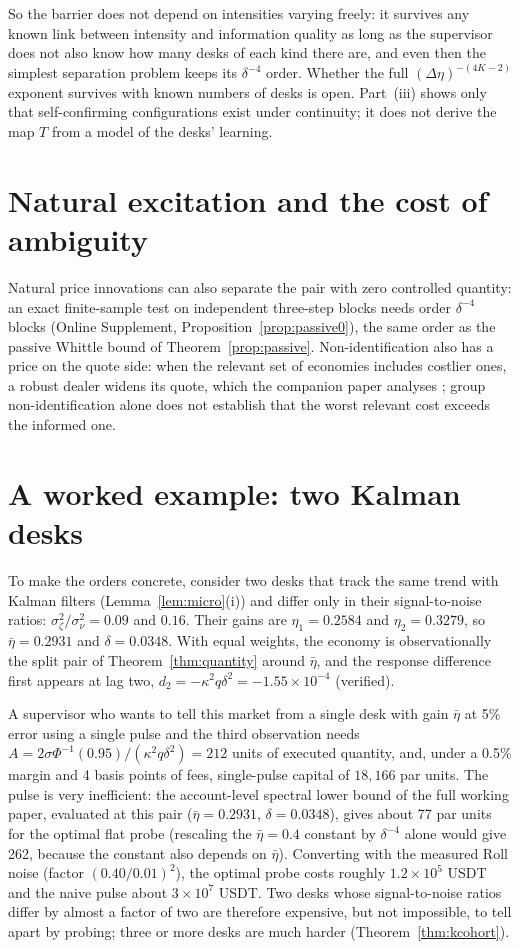 \documentclass[12pt]{article}
\theoremstyle{definition}
\theoremstyle{remark}
\begin{document}
So the barrier does not depend on intensities varying freely: it survives any known link between intensity and information quality as long as the supervisor does not also know how many desks of each kind there are, and even then the simplest separation problem keeps its $\delta^{-4}$ order. Whether the full $(\Delta\eta)^{-(4K-2)}$ exponent survives with known numbers of desks is open. Part~(iii) shows only that self-confirming configurations exist under continuity; it does not derive the map $T$ from a model of the desks' learning.

\section{Natural excitation and the cost of ambiguity}

Natural price innovations can also separate the pair with zero controlled quantity: an exact finite-sample test on independent three-step blocks needs order $\delta^{-4}$ blocks (Online Supplement, Proposition~\ref{prop:passive0}), the same order as the passive Whittle bound of Theorem~\ref{prop:passive}. Non-identification also has a price on the quote side: when the relevant set of economies includes costlier ones, a robust dealer widens its quote, which the companion paper analyses \citep{niroula2026b}; group non-identification alone does not establish that the worst relevant cost exceeds the informed one.
\section{A worked example: two Kalman desks}\label{sec:worked}

To make the orders concrete, consider two desks that track the same trend with Kalman filters (Lemma~\ref{lem:micro}(i)) and differ only in their signal-to-noise ratios: $\sigma_\zeta^2/\sigma_\nu^2=0.09$ and $0.16$. Their gains are $\eta_1=0.2584$ and $\eta_2=0.3279$, so $\bar\eta=0.2931$ and $\delta=0.0348$. With equal weights, the economy is observationally the split pair of Theorem~\ref{thm:quantity} around $\bar\eta$, and the response difference first appears at lag two, $d_2=-\kappa^2q\delta^2=-1.55\times10^{-4}$ (verified).

A supervisor who wants to tell this market from a single desk with gain $\bar\eta$ at 5\% error using a single pulse and the third observation needs $A=2\sigma\Phi^{-1}(0.95)/(\kappa^2q\delta^2)=212$ units of executed quantity, and, under a 0.5\% margin and 4 basis points of fees, single-pulse capital of $18{,}166$ par units. The pulse is very inefficient: the account-level spectral lower bound of the full working paper, evaluated at this pair ($\bar\eta=0.2931$, $\delta=0.0348$), gives about 77 par units for the optimal flat probe (rescaling the $\bar\eta=0.4$ constant by $\delta^{-4}$ alone would give 262, because the constant also depends on $\bar\eta$). Converting with the measured Roll noise (factor $(0.40/0.01)^2$), the optimal probe costs roughly $1.2\times10^5$ USDT and the naive pulse about $3\times10^7$ USDT. Two desks whose signal-to-noise ratios differ by almost a factor of two are therefore expensive, but not impossible, to tell apart by probing; three or more desks are much harder (Theorem~\ref{thm:kcohort}).
\end{document}

